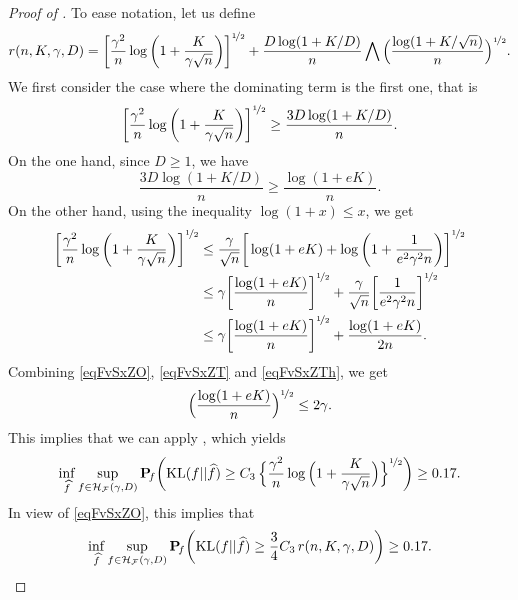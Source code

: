 \begin{proof}[Proof of ]
	To ease notation, let us define
	\begin{equation}
	\small
	r(n,K,\gamma,D) = \bigg[\frac{\gamma^2}{n}
	\log\bigg(1+\frac{K}{\gamma\sqrt{n}}\bigg)\bigg]^{\nicefrac12}
	+ \frac{D\log(1+K/D)}{n}\bigwedge \Big(\frac{\log(1+K/\sqrt{n})}{n}\Big)^{\nicefrac12}.
	\end{equation}
	We first consider the case where the dominating term is the first one, that is 
	\begin{equation}\label{eqFvSxZO}
	\bigg[\frac{\gamma^2}{n} \log\bigg(1+\frac{K}{\gamma\sqrt{n}}\bigg)\bigg]^{\nicefrac12}
	\ge \frac{ 3 D\log(1+K/D)}{n}.
	\end{equation}
	On the one hand, since $D\ge 1$, we have
	\begin{equation}\label{eqFvSxZT}
	\frac{ 3D\log(1+K/D)}{n}\ge \frac{ \log(1+eK)}{n}.
	\end{equation}
	On the other hand, using the inequality $\log(1+x)\le x$, we get
	\begin{align}
	\bigg[\frac{\gamma^2}{n} \log\bigg(1+\frac{K}{\gamma\sqrt{n}}\bigg)\bigg]^{\nicefrac12}
	&\le \frac{\gamma}{\sqrt{n}}\bigg[\log(1+eK)+\log\bigg(1+\frac{1}{e^2\gamma^2n}\bigg)\bigg]^{\nicefrac12}\\
	&\le \gamma\bigg[\frac{\log(1+eK)}{n}\bigg]^{\nicefrac12}+\frac{\gamma}{\sqrt{n}}\bigg[\frac{1}{e^2\gamma^2n}\bigg]^{\nicefrac12}\\
	&\le \gamma\bigg[\frac{\log(1+eK)}{n}\bigg]^{\nicefrac12}+\frac{\log (1+eK)}{2n}.\label{eqFvSxZTh}
	\end{align}
	Combining \eqref{eqFvSxZO}, \eqref{eqFvSxZT} and \eqref{eqFvSxZTh}, we get
	\begin{equation}
	\Big(\frac{\log(1+eK)}{n}\Big)^{\nicefrac12}\le 2\gamma.
	\end{equation}
	This implies that we can apply , which yields
	\begin{equation}
	\inf_{\widehat f}\sup_{f \in \mathcal H_\mathcal F(\gamma,D)}\mathbf P\!_{f}\bigg({\rm KL}(f||\widehat f)\geq
	C_3\,\Big\{{\frac{\gamma^2}n\log\Big(1+\frac{K}{\gamma\sqrt{n}}\Big)}\Big\}^{\nicefrac12}\bigg)\geq 0.17.
	\end{equation}
	In view of \eqref{eqFvSxZO}, this implies that
	\begin{equation}\label{eqFvSxZFr}
	\inf_{\widehat f}\sup_{f \in \mathcal H_\mathcal F(\gamma,D)}\mathbf P\!_{f}\bigg({\rm KL}(f||\widehat f)\geq
	\frac34C_3\,r(n,K,\gamma,D)\bigg)\geq 0.17.
	\end{equation}

\end{proof}
